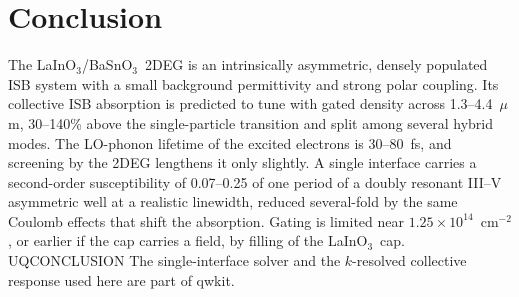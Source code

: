 \documentclass[11pt]{article}
\newcommand{\LIO}{LaInO$_3$}
\newcommand{\BSO}{BaSnO$_3$}
\begin{document}
\section{Conclusion}
The \LIO/\BSO\ 2DEG is an intrinsically asymmetric, densely populated ISB system with a small background permittivity and strong polar coupling. Its collective ISB absorption is predicted to tune with gated density across 1.3--4.4~$\mu$m, 30--140\% above the single-particle transition and split among several hybrid modes. The LO-phonon lifetime of the excited electrons is 30--80~fs, and screening by the 2DEG lengthens it only slightly. A single interface carries a second-order susceptibility of 0.07--0.25 of one period of a doubly resonant III--V asymmetric well at a realistic linewidth, reduced several-fold by the same Coulomb effects that shift the absorption. Gating is limited near $1.25\times10^{14}$~cm$^{-2}$, or earlier if the cap carries a field, by filling of the \LIO\ cap. UQCONCLUSION The single-interface solver and the $k$-resolved collective response used here are part of qwkit.



\end{document}
